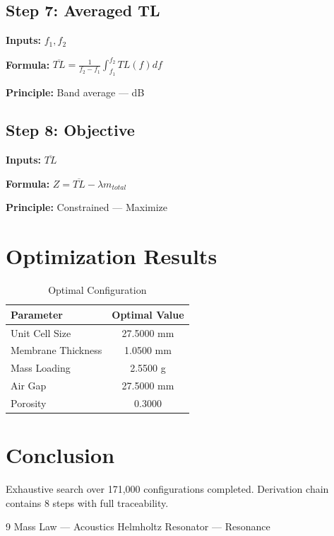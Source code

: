 \documentclass[11pt,twocolumn]{article}
\begin{document}
\subsection*{Step 7: Averaged TL}
\textbf{Inputs:} $f_1, f_2$

\textbf{Formula:} $\overline{TL} = \frac{1}{f_2-f_1}\int_{f_1}^{f_2} TL(f) df$

\textbf{Principle:} Band average --- dB

\subsection*{Step 8: Objective}
\textbf{Inputs:} $\overline{TL}$

\textbf{Formula:} $Z = \overline{TL} - \lambda m_{total}$

\textbf{Principle:} Constrained --- Maximize


\section{Optimization Results}
\begin{table}[h]
\centering
\caption{Optimal Configuration}
\begin{tabular}{@{}lc@{}}
\toprule
Parameter & Optimal Value \\
\midrule
Unit Cell Size & 27.5000 mm \\
Membrane Thickness & 1.0500 mm \\
Mass Loading & 2.5500 g \\
Air Gap & 27.5000 mm \\
Porosity & 0.3000  \\
\bottomrule
\end{tabular}
\end{table}

\section{Conclusion}
Exhaustive search over 171,000 configurations completed.
Derivation chain contains 8 steps with full traceability.

\begin{thebibliography}{9}
 Mass Law --- Acoustics
 Helmholtz Resonator --- Resonance
\end{thebibliography}
\end{document}
